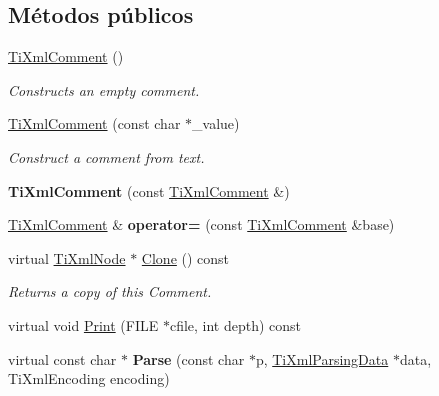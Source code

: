 \subsection*{\-Métodos públicos}
\begin{DoxyCompactItemize}
\item 
\hypertarget{classTiXmlComment_aaa3252031d3e8bd3a2bf51a1c61201b7}{\hyperlink{classTiXmlComment_aaa3252031d3e8bd3a2bf51a1c61201b7}{\-Ti\-Xml\-Comment} ()}\label{classTiXmlComment_aaa3252031d3e8bd3a2bf51a1c61201b7}

\begin{DoxyCompactList}\small\item\em \-Constructs an empty comment. \end{DoxyCompactList}\item 
\hypertarget{classTiXmlComment_a37e7802ef17bc03ebe5ae79bf0713d47}{\hyperlink{classTiXmlComment_a37e7802ef17bc03ebe5ae79bf0713d47}{\-Ti\-Xml\-Comment} (const char $\ast$\-\_\-value)}\label{classTiXmlComment_a37e7802ef17bc03ebe5ae79bf0713d47}

\begin{DoxyCompactList}\small\item\em \-Construct a comment from text. \end{DoxyCompactList}\item 
\hypertarget{classTiXmlComment_afaec41ac2760ce946ba1590eb5708e50}{{\bfseries \-Ti\-Xml\-Comment} (const \hyperlink{classTiXmlComment}{\-Ti\-Xml\-Comment} \&)}\label{classTiXmlComment_afaec41ac2760ce946ba1590eb5708e50}

\item 
\hypertarget{classTiXmlComment_aeceedc15f8b8f9ca0b6136696339b3ac}{\hyperlink{classTiXmlComment}{\-Ti\-Xml\-Comment} \& {\bfseries operator=} (const \hyperlink{classTiXmlComment}{\-Ti\-Xml\-Comment} \&base)}\label{classTiXmlComment_aeceedc15f8b8f9ca0b6136696339b3ac}

\item 
\hypertarget{classTiXmlComment_a4f6590c9c9a2b63a48972655b78eb853}{virtual \hyperlink{classTiXmlNode}{\-Ti\-Xml\-Node} $\ast$ \hyperlink{classTiXmlComment_a4f6590c9c9a2b63a48972655b78eb853}{\-Clone} () const }\label{classTiXmlComment_a4f6590c9c9a2b63a48972655b78eb853}

\begin{DoxyCompactList}\small\item\em \-Returns a copy of this \-Comment. \end{DoxyCompactList}\item 
virtual void \hyperlink{classTiXmlComment_a17398061d62c470f57801ce28fa33ad4}{\-Print} (\-F\-I\-L\-E $\ast$cfile, int depth) const 
\item 
\hypertarget{classTiXmlComment_a43bddc18ac057734b41d84653b71d3e0}{virtual const char $\ast$ {\bfseries \-Parse} (const char $\ast$p, \hyperlink{classTiXmlParsingData}{\-Ti\-Xml\-Parsing\-Data} $\ast$data, \-Ti\-Xml\-Encoding encoding)}\label{classTiXmlComment_a43bddc18ac057734b41d84653b71d3e0}


\end{DoxyCompactItemize}
